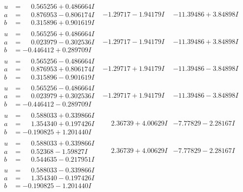 \documentclass[1p]{elsarticle_modified}
\theoremstyle{definition}
\begin{document}
$$\begin{array}{c|c|c}
\begin{aligned}
u &= \phantom{-}0.565256 + 0.486664 I \\
a &= \phantom{-}0.876953 - 0.806174 I \\
b &= \phantom{-}0.315896 + 0.901619 I\end{aligned}
 & -1.29717 - 1.94179 I & -11.39486 + 3.84898 I \\ \hline\begin{aligned}
u &= \phantom{-}0.565256 + 0.486664 I \\
a &= \phantom{-}0.023979 - 0.302536 I \\
b &= -0.446412 + 0.289709 I\end{aligned}
 & -1.29717 - 1.94179 I & -11.39486 + 3.84898 I \\ \hline\begin{aligned}
u &= \phantom{-}0.565256 - 0.486664 I \\
a &= \phantom{-}0.876953 + 0.806174 I \\
b &= \phantom{-}0.315896 - 0.901619 I\end{aligned}
 & -1.29717 + 1.94179 I & -11.39486 - 3.84898 I \\ \hline\begin{aligned}
u &= \phantom{-}0.565256 - 0.486664 I \\
a &= \phantom{-}0.023979 + 0.302536 I \\
b &= -0.446412 - 0.289709 I\end{aligned}
 & -1.29717 + 1.94179 I & -11.39486 - 3.84898 I \\ \hline\begin{aligned}
u &= \phantom{-}0.588033 + 0.339866 I \\
a &= \phantom{-}1.354340 + 0.197426 I \\
b &= -0.190825 + 1.201440 I\end{aligned}
 & \phantom{-}2.36739 + 4.00629 I & -7.77829 - 2.28167 I \\ \hline\begin{aligned}
u &= \phantom{-}0.588033 + 0.339866 I \\
a &= \phantom{-}0.52368 - 1.59827 I \\
b &= \phantom{-}0.544635 - 0.217951 I\end{aligned}
 & \phantom{-}2.36739 + 4.00629 I & -7.77829 - 2.28167 I \\ \hline\begin{aligned}
u &= \phantom{-}0.588033 - 0.339866 I \\
a &= \phantom{-}1.354340 - 0.197426 I \\
b &= -0.190825 - 1.201440 I\end{aligned}

\end{array}$$
\end{document}

